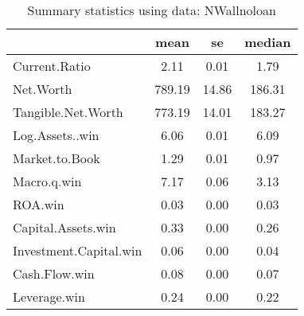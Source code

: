 \begin{table}[ht]
\centering
\caption{Summary statistics using data: NWallnoloan} 
\label{tab:sumstats}
\begingroup\footnotesize
\begin{tabular}{lccc}
  \hline
 & mean & se & median \\ 
  \hline
Current.Ratio & 2.11 & 0.01 & 1.79 \\ 
  Net.Worth & 789.19 & 14.86 & 186.31 \\ 
  Tangible.Net.Worth & 773.19 & 14.01 & 183.27 \\ 
  Log.Assets..win & 6.06 & 0.01 & 6.09 \\ 
  Market.to.Book & 1.29 & 0.01 & 0.97 \\ 
  Macro.q.win & 7.17 & 0.06 & 3.13 \\ 
  ROA.win & 0.03 & 0.00 & 0.03 \\ 
  Capital.Assets.win & 0.33 & 0.00 & 0.26 \\ 
  Investment.Capital.win & 0.06 & 0.00 & 0.04 \\ 
  Cash.Flow.win & 0.08 & 0.00 & 0.07 \\ 
  Leverage.win & 0.24 & 0.00 & 0.22 \\ 
   \hline
\end{tabular}
\endgroup
\end{table}

